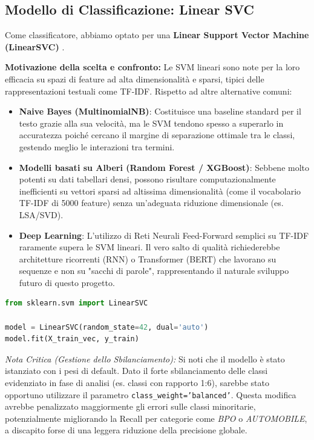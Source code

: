 \documentclass[a4paper,12pt]{article}
\begin{document}
\subsection{Modello di Classificazione: Linear SVC}
Come classificatore, abbiamo optato per una \textbf{Linear Support Vector Machine (LinearSVC)} \cite{svm}.

\textbf{Motivazione della scelta e confronto:}
Le SVM lineari sono note per la loro efficacia su spazi di feature ad alta dimensionalità e sparsi, tipici delle rappresentazioni testuali come TF-IDF.
Rispetto ad altre alternative comuni:
\begin{itemize}
    \item \textbf{Naive Bayes (MultinomialNB)}: Costituisce una baseline standard per il testo grazie alla sua velocità, ma le SVM tendono spesso a superarlo in accuratezza poiché cercano il margine di separazione ottimale tra le classi, gestendo meglio le interazioni tra termini.
    \item \textbf{Modelli basati su Alberi (Random Forest / XGBoost)}: Sebbene molto potenti su dati tabellari densi, possono risultare computazionalmente inefficienti su vettori sparsi ad altissima dimensionalità (come il vocabolario TF-IDF di 5000 feature) senza un'adeguata riduzione dimensionale (es. LSA/SVD).
    \item \textbf{Deep Learning}: L'utilizzo di Reti Neurali Feed-Forward semplici su TF-IDF raramente supera le SVM lineari. Il vero salto di qualità richiederebbe architetture ricorrenti (RNN) o Transformer (BERT) che lavorano su sequenze e non su "sacchi di parole", rappresentando il naturale sviluppo futuro di questo progetto.
\end{itemize}

\begin{lstlisting}[language=Python, caption=Addestramento del modello LinearSVC]
from sklearn.svm import LinearSVC

model = LinearSVC(random_state=42, dual='auto')
model.fit(X_train_vec, y_train)
\end{lstlisting}

\textit{Nota Critica (Gestione dello Sbilanciamento):} Si noti che il modello è stato istanziato con i pesi di default. Dato il forte sbilanciamento delle classi evidenziato in fase di analisi (es. classi con rapporto 1:6), sarebbe stato opportuno utilizzare il parametro \texttt{class\_weight='balanced'}. Questa modifica avrebbe penalizzato maggiormente gli errori sulle classi minoritarie, potenzialmente migliorando la Recall per categorie come \textit{BPO} o \textit{AUTOMOBILE}, a discapito forse di una leggera riduzione della precisione globale.
\end{document}

